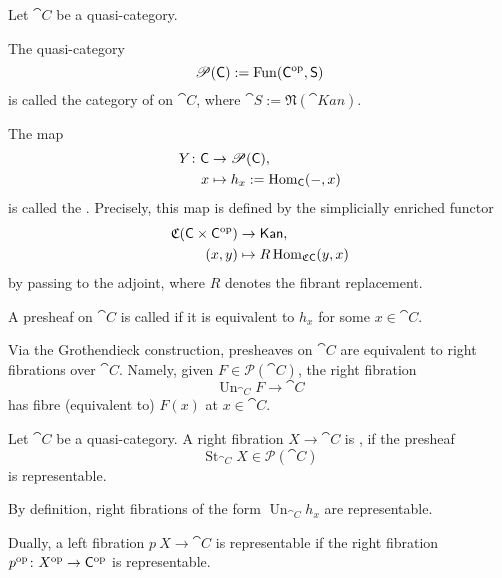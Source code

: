 \begin{definition}
    Let $\cat C$ be a quasi-category.
    
    \begin{itms}
        \item The quasi-category 
        \[ \mathscr P(\mathsf{C}):=\operatorname{Fun}(\mathsf{C}^{\mathrm{op}},\mathsf{S}) \]
        is called the category of  on $\cat C$,
        where $\cat S:=\mathfrak N(\cat{Kan})$.
    
        \item The map
        \[\begin{aligned}
            Y\colon\mathsf{C}&\to\mathscr P(\mathsf{C}),\\
            x&\mapsto h_x:=\operatorname{Hom}_{\mathsf{C}}(-,x)
        \end{aligned}\]
        is called the .
        Precisely, this map is defined by the simplicially enriched functor 
        \[\begin{aligned}
            \mathfrak C(\mathsf{C}\times\mathsf{C}^{\mathrm{op}})&\to\mathsf{Kan},\\
            (x,y)&\mapsto R\operatorname{Hom}_{\mathfrak C\mathsf{C}}(y,x)
        \end{aligned}\]
        by passing to the adjoint,
        where $R$ denotes the fibrant replacement.
    
        \item A presheaf on $\cat C$ is called  if 
        it is equivalent to $h_x$ for some $x\in\cat C$.
    \end{itms}
\end{definition}

Via the Grothendieck construction,
presheaves on $\cat C$ are equivalent to right fibrations over $\cat C$.
Namely, given $F\in\mathscr P(\cat C)$, the right fibration 
\[ \operatorname{Un}_{\cat C}F\to\cat C \]
has fibre (equivalent to) $F(x)$ at $x\in\cat C$.

\begin{definition}
    Let $\cat C$ be a quasi-category.
    A right fibration $X\to\cat C$ is , 
    if the presheaf 
    \[ \operatorname{St}_{\cat C}X\in\mathscr P(\cat C) \]
    is representable.
\end{definition}

By definition, right fibrations of the form $\operatorname{Un}_{\cat C}h_x$
are representable.

Dually, a left fibration $p\:X\to\cat C$ is representable 
if the right fibration $p^{\mathrm{op}}\colon X^{\mathrm{op}}\to\mathsf{C}^{\mathrm{op}}$ is representable.


